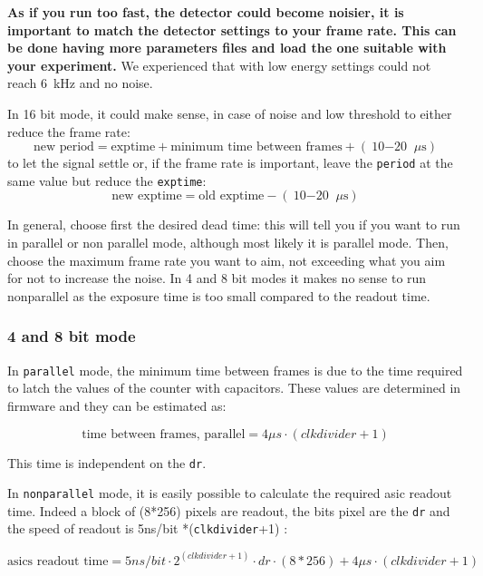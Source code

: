 \documentclass{article}
\begin{document}
\textbf{As if you run too fast, the detector could become noisier, it is important to match the detector settings to your frame rate. This can be done having more parameters files and load the one suitable with your experiment.} We experienced that with low energy settings could not reach 6~kHz and no noise.

In 16 bit mode, it could make sense, in case of noise and low threshold to either reduce the frame rate:
\begin{equation} 
\textrm{new period}  = \textrm{exptime} + \textrm{minimum time between frames} + (\textrm{10$-$20 }\mu \textrm{s})
\end{equation}
to let the signal settle  or,  if the frame rate is important, leave the {\tt{period}} at the same value but reduce the {\tt{exptime}}:
\begin{equation} 
\textrm{new exptime}  = \textrm{old exptime} - (\textrm{10$-$20 }\mu \textrm{s})
\end{equation}

In general, choose first the desired dead time: this will tell you if you want to run in parallel or non parallel mode, although most likely it is parallel mode. Then, choose the maximum frame rate you want to aim, not exceeding what you aim for not to increase the noise. In 4 and 8 bit modes it makes no sense to run nonparallel as the exposure time is too small compared to the readout time. 

\subsubsection{4 and 8 bit mode}
In {\tt{parallel}} mode, the minimum time between frames is due to the time required to latch the values of the counter with capacitors. These values are determined in firmware and they can be estimated as:

\begin{equation} \label{dtparallel}
\textrm{time between frames, parallel} = 4 \mu s \cdot (clkdivider+1)
\end{equation}

This time is independent on the {\tt{dr}}.

In {\tt{nonparallel}} mode, it is easily possible to calculate the required asic readout time. 
Indeed a block of (8*256) pixels are readout, the bits pixel are the {\tt{dr}} and the speed of readout is 5ns/bit *({\tt{clkdivider}}+1) : 

\begin{equation}\label{dtnonparallel}
\textrm{asics readout time} = 5ns/bit \cdot 2^{(clkdivider+1)} \cdot dr \cdot (8*256) + 4 \mu s \cdot (clkdivider+1)
\end{equation}
\end{document}
